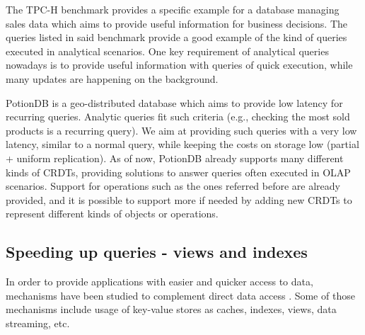 The TPC-H benchmark \cite{tpch, dbtoaster, partView, lazyMaintenance} provides a specific example for a database managing sales data which aims to provide useful information for business decisions.
The queries listed in said benchmark provide a good example of the kind of queries executed in analytical scenarios.
One key requirement of analytical queries nowadays is to provide useful information with queries of quick execution, while many updates are happening on the background.

PotionDB is a geo-distributed database which aims to provide low latency for recurring queries.
Analytic queries fit such criteria (e.g., checking the most sold products is a recurring query).
We aim at providing such queries with a very low latency, similar to a normal query, while keeping the costs on storage low (partial + uniform replication).
As of now, PotionDB already supports many different kinds of CRDTs, providing solutions to answer queries often executed in OLAP scenarios.
Support for operations such as the ones referred before are already provided, and it is possible to support more if needed by adding new CRDTs to represent different kinds of objects or operations.
 





\subsection{Speeding up queries - views and indexes}
\label{subsec:views}

In order to provide applications with easier and quicker access to data, mechanisms have been studied to complement direct data access \cite{noria, dbtoaster, pequod, txcache, viewSelection, optIncMaintenance, effMaintenance, lazyMaintenance, genIndex, partIndex, dbproxy}. 
Some of those mechanisms include usage of key-value stores as caches, indexes, views, data streaming, etc.

